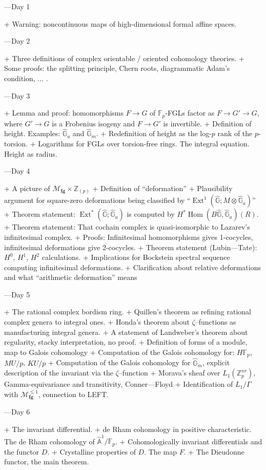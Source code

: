 \documentclass[12pt]{book}
\newcommand{\Z}{\mathbb Z}
\newcommand{\F}{\mathbb F}
\newcommand{\G}{\widehat{\mathbb G}}
\newcommand{\A}{\widehat{\mathbb{A}}}
\newcommand{\<}{\langle}
\renewcommand{\>}{\rangle}
\newcommand{\moduli}[1]{\mathcal{M}_{\mathbf{#1}}}
\DeclareMathOperator{\Ext}{Ext}
\numberwithin{equation}{section}
\theoremstyle{plain}
\theoremstyle{definition}
\theoremstyle{remark}
\begin{document}
---Day 1

+ Warning: noncontinuous maps of high-dimensional formal affine spaces.

---Day 2

+ Three definitions of complex orientable / oriented cohomology theories.
+ Some proofs: the splitting principle, Chern roots, diagrammatic Adam's condition, ... .

---Day 3

+ Lemma and proof: homomorphisms $F \to G$ of $\F_p$-FGLs factor as $F \to G' \to G$, where $G' \to G$ is a Frobenius isogeny and $F \to G'$ is invertible.
+ Definition of height.  Examples: $\G_a$ and $\G_m$.
+ Redefinition of height as the log-$p$ rank of the $p$-torsion.
+ Logarithms for FGLs over torsion-free rings.  The integral equation.  Height as radius.

---Day 4

+ A picture of $\moduli{fg} \times \Z_{(p)}$
+ Definition of ``deformation''
+ Plausibility argument for square-zero deformations being classified by ``$\Ext^1(\G; M \otimes \G_a)$''
+ Theorem statement: $\Ext^*(\G; \G_a)$ is computed by $H^* \operatorname{Hom}(B\G, \G_a)(R)$.
+ Theorem statement: That cochain complex is quasi-isomorphic to Lazarev's infinitesimal complex.
+ Proofs: Infinitesimal homomorphisms gives 1-cocycles, infinitesimal deformations give 2-cocycles.
+ Theorem statement (Lubin—Tate): $H^0$, $H^1$, $H^2$ calculations.
+ Implications for Bockstein spectral sequence computing infinitesimal deformations.
+ Clarification about relative deformations and what ``arithmetic deformation'' means

---Day 5

+ The rational complex bordism ring.
+ Quillen’s theorem as refining rational complex genera to integral ones.
+ Honda’s theorem about $\zeta$--functions as manufacturing integral genera.
+ A statement of Landweber's theorem about regularity, stacky interpretation, no proof.
+ Definition of forms of a module, map to Galois cohomology
+ Computation of the Galois cohomology for: $H\F_p$, $MU/p$, $KU/p$
+ Computation of the Galois cohomology for $\G_m$, explicit description of the invariant via the $\zeta$--function
+ Morava’s sheaf over $L_1(\Z_p^{nr})$, Gamma-equivariance and transitivity, Conner—Floyd
+ Identification of $L_1 / \Gamma$ with $\moduli{fg}^{\le 1}$, connection to LEFT.

---Day 6

+ The invariant differential.
+ de Rham cohomology in positive characteristic.  The de Rham cohomology of $\A^1 / \F_p$.
+ Cohomologically invariant differentials and the functor $D$.
+ Crystalline properties of $D$.  The map $F$.
+ The Dieudonne functor, the main theorem.
\end{document}
